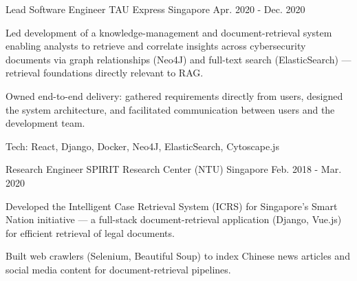 \begin{cventries}
  \cventry
    {Lead Software Engineer} %
    {TAU Express} %
    {Singapore} %
    {Apr. 2020 - Dec. 2020} %
    {
      \begin{cvitems} %
        \item {Led development of a knowledge-management and document-retrieval system enabling analysts to retrieve and correlate insights across cybersecurity documents via graph relationships (Neo4J) and full-text search (ElasticSearch) --- retrieval foundations directly relevant to RAG.}
        \item {Owned end-to-end delivery: gathered requirements directly from users, designed the system architecture, and facilitated communication between users and the development team.}
        \item {Tech: React, Django, Docker, Neo4J, ElasticSearch, Cytoscape.js}
      \end{cvitems}
    }

  \cventry
    {Research Engineer} %
    {SPIRIT Research Center (NTU)} %
    {Singapore} %
    {Feb. 2018 - Mar. 2020} %
    {
      \begin{cvitems} %
        \item {Developed the Intelligent Case Retrieval System (ICRS) for Singapore's Smart Nation initiative --- a full-stack document-retrieval application (Django, Vue.js) for efficient retrieval of legal documents.}
        \item {Built web crawlers (Selenium, Beautiful Soup) to index Chinese news articles and social media content for document-retrieval pipelines.}
      \end{cvitems}
    }

\end{cventries}
